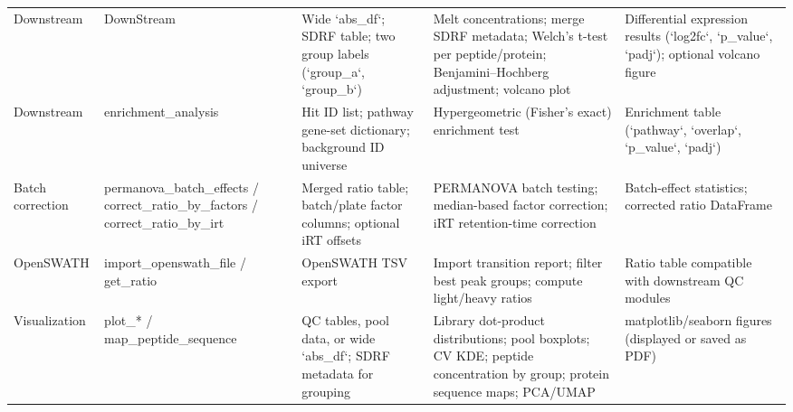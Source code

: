 \begin{table}
\begin{tabular}{llp{3.5cm}p{4.5cm}p{3.5cm}}
Downstream & DownStream & Wide `abs\_df`; SDRF table; two group labels (`group\_a`, `group\_b`) & Melt concentrations; merge SDRF metadata; Welch's t-test per peptide/protein; Benjamini–Hochberg adjustment; volcano plot & Differential expression results (`log2fc`, `p\_value`, `padj`); optional volcano figure \\
Downstream & enrichment\_analysis & Hit ID list; pathway gene-set dictionary; background ID universe & Hypergeometric (Fisher's exact) enrichment test & Enrichment table (`pathway`, `overlap`, `p\_value`, `padj`) \\
Batch correction & permanova\_batch\_effects / correct\_ratio\_by\_factors / correct\_ratio\_by\_irt & Merged ratio table; batch/plate factor columns; optional iRT offsets & PERMANOVA batch testing; median-based factor correction; iRT retention-time correction & Batch-effect statistics; corrected ratio DataFrame \\
OpenSWATH & import\_openswath\_file / get\_ratio & OpenSWATH TSV export & Import transition report; filter best peak groups; compute light/heavy ratios & Ratio table compatible with downstream QC modules \\
Visualization & plot\_* / map\_peptide\_sequence & QC tables, pool data, or wide `abs\_df`; SDRF metadata for grouping & Library dot-product distributions; pool boxplots; CV KDE; peptide concentration by group; protein sequence maps; PCA/UMAP & matplotlib/seaborn figures (displayed or saved as PDF) \\
\bottomrule
\end{tabular}
\end{table}

